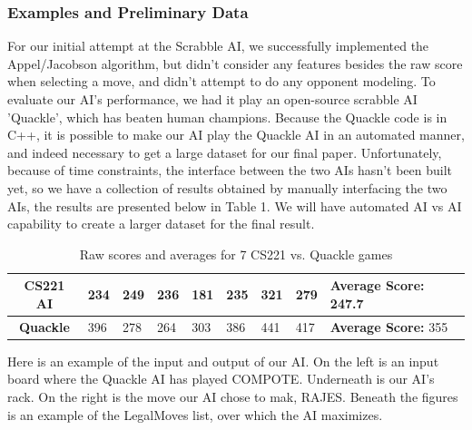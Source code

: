 \documentclass[12pt]{article}
\begin{document}
\subsubsection*{Examples and Preliminary Data}
For our initial attempt at the Scrabble AI, we successfully
implemented the Appel/Jacobson algorithm, but didn't consider any
features besides the raw score when selecting a move, and didn't
attempt to do any opponent modeling.  To evaluate our AI's
performance, we had it play an open-source scrabble AI 'Quackle',
which has beaten human champions. Because the Quackle code is in C++,
it is possible to make our AI play the Quackle AI in an automated
manner, and indeed necessary to get a large dataset for our final
paper. Unfortunately, because of time constraints, the interface
between the two AIs hasn't been built yet, so we have a collection of
results obtained by manually interfacing the two AIs, the results are
presented below in Table 1.  We will have automated AI vs AI
capability to create a larger dataset for the final result. \\

\begin{table}[h]
  \centering
\begin{tabular}{c|l|l|l|l|l|l|l|l}
  \textbf{CS221 AI} & 234 & 249 & 236 & 181 & 235 & 321 & 279 & \textbf{Average Score: } 247.7 \\\hline
  \textbf{Quackle}  & 396 & 278 & 264 & 303 & 386 & 441 & 417 & \textbf{Average Score: } 355\\
\end{tabular}
\caption{Raw scores and averages for 7 CS221 vs. Quackle games}
\end{table}

Here is an example of the input and output of our AI. On the left is an input board where the Quackle AI has played COMPOTE. Underneath is our AI's rack. On the right is the move our AI chose to mak, RAJES. Beneath the figures is an example of the LegalMoves list, over which the AI maximizes. 
\end{document}
